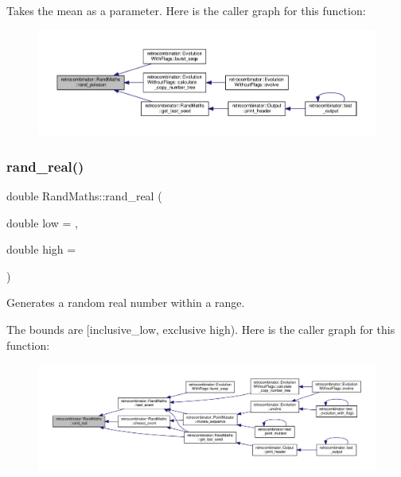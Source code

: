 Takes the mean as a parameter. Here is the caller graph for this function\+:
\nopagebreak
\begin{figure}[H]
\begin{center}
\leavevmode
\includegraphics[width=350pt]{classretrocombinator_1_1RandMaths_adef66efd4d58f6130982ff0ee0e25750_icgraph}
\end{center}
\end{figure}
\mbox{\label{classretrocombinator_1_1RandMaths_aa6441baa59bff50f588c0c54e3c54140}} 
\subsubsection{\texorpdfstring{rand\+\_\+real()}{rand\_real()}}
{\footnotesize\ttfamily double Rand\+Maths\+::rand\+\_\+real (\begin{DoxyParamCaption}\item[{double}]{low = {},  }\item[{double}]{high = {} }\end{DoxyParamCaption})}



Generates a random real number within a range. 

The bounds are \mbox{[}inclusive\+\_\+low, exclusive high). Here is the caller graph for this function\+:
\nopagebreak
\begin{figure}[H]
\begin{center}
\leavevmode
\includegraphics[width=350pt]{classretrocombinator_1_1RandMaths_aa6441baa59bff50f588c0c54e3c54140_icgraph}
\end{center}
\end{figure}
\mbox{\label{classretrocombinator_1_1RandMaths_a2758ba7c9818bc664c4b751a697e1fe6}} 
